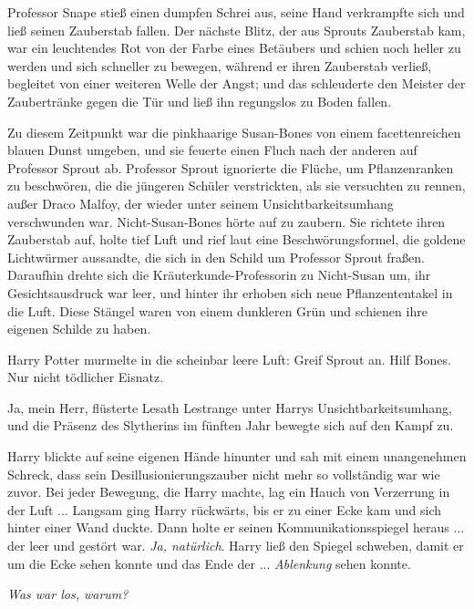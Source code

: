 Professor Snape stieß einen dumpfen Schrei aus, seine Hand verkrampfte sich und
ließ seinen Zauberstab fallen. Der nächste Blitz, der aus Sprouts Zauberstab
kam, war ein leuchtendes Rot von der Farbe eines Betäubers und schien noch
heller zu werden und sich schneller zu bewegen, während er ihren Zauberstab
verließ, begleitet von einer weiteren Welle der Angst; und das schleuderte den
Meister der Zaubertränke gegen die Tür und ließ ihn regungslos zu Boden fallen.

Zu diesem Zeitpunkt war die pinkhaarige Susan-Bones von einem facettenreichen
blauen Dunst umgeben, und sie feuerte einen Fluch nach der anderen auf Professor
Sprout ab. Professor Sprout ignorierte die Flüche, um Pflanzenranken zu
beschwören, die die jüngeren Schüler verstrickten, als sie versuchten zu rennen,
außer Draco Malfoy, der wieder unter seinem Unsichtbarkeitsumhang verschwunden
war. Nicht-Susan-Bones hörte auf zu zaubern. Sie richtete ihren Zauberstab auf,
holte tief Luft und rief laut eine Beschwörungsformel, die goldene Lichtwürmer
aussandte, die sich in den Schild um Professor Sprout fraßen. Daraufhin drehte
sich die Kräuterkunde-Professorin zu Nicht-Susan um, ihr Gesichtsausdruck war
leer, und hinter ihr erhoben sich neue Pflanzententakel in die Luft. Diese
Stängel waren von einem dunkleren Grün und schienen ihre eigenen Schilde zu
haben.

Harry Potter murmelte in die scheinbar leere Luft: \glqq{}Greif Sprout an. Hilf
Bones. Nur nicht tödlicher Eisnatz.\grqq{}

\glqq{}Ja, mein Herr\grqq{}, flüsterte Lesath Lestrange unter Harrys
Unsichtbarkeitsumhang, und die Präsenz des Slytherins im fünften Jahr bewegte
sich auf den Kampf zu.

Harry blickte auf seine eigenen Hände hinunter und sah mit einem unangenehmen
Schreck, dass sein Desillusionierungszauber nicht mehr so vollständig war wie
zuvor. Bei jeder Bewegung, die Harry machte, lag ein Hauch von Verzerrung in der
Luft ... Langsam ging Harry rückwärts, bis er zu einer Ecke kam und sich hinter
einer Wand duckte. Dann holte er seinen Kommunikationsspiegel heraus ... der leer
und gestört war. \emph{Ja, natürlich}. Harry ließ den Spiegel schweben, damit er
um die Ecke sehen konnte und das Ende der ... \emph{Ablenkung} sehen konnte.

\emph{Was war los, warum?}

